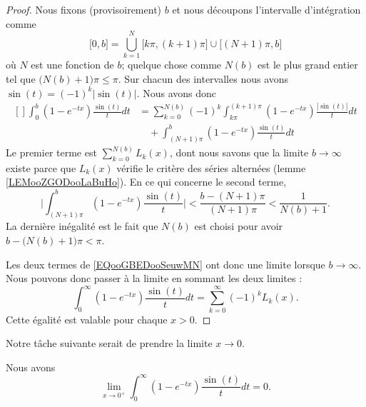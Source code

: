 \begin{proof}
    Nous fixons (provisoirement) \( b\) et nous découpons l'intervalle d'intégration comme
    \begin{equation}
        \mathopen[ 0 , b \mathclose]=\bigcup_{k=1}^N\mathopen[ k\pi , (k+1)\pi \mathclose]\cup\mathopen\big[ (N+1)\pi  , b \mathclose\big]
    \end{equation}
    où \( N\) est une fonction de \( b\); quelque chose comme \( N(b)\) est le plus grand entier tel que \(\big( N(b)+1 \big)\pi\leq \pi\). Sur chacun des intervalles nous avons \( \sin(t)=(-1)^k| \sin(t) |\). Nous avons donc
    \begin{equation}       \label{EQooGBEDooSeuwMN}
        \begin{aligned}[]
            \int_0^b(1- e^{-tx})\frac{ \sin(t) }{ t }dt&=\sum_{k=0}^{N(b)}(-1)^k\int_{k\pi}^{(k+1)\pi}(1- e^{-tx})\frac{ | \sin(t) | }{ t }dt\\
                &\quad+\int_{(N+1)\pi}^b(1- e^{-tx})\frac{ \sin(t) }{ t }dt
        \end{aligned}
    \end{equation}
    Le premier terme est \( \sum_{k=0}^{N(b)}L_k(x)\), dont nous savons que la limite \( b\to \infty\) existe parce que \( L_k(x)\) vérifie le critère des séries alternées (lemme \ref{LEMooZGODooLaBuHo}). En ce qui concerne le second terme,
    \begin{equation}
        \big|\int_{(N+1)\pi}^b (1- e^{-tx})\frac{ \sin(t) }{ t }\big| <  \frac{  b-( N+1 )\pi    }{ ( N+1 )\pi }<\frac{1}{ N(b)+1 }.
    \end{equation}
    La dernière inégalité est le fait que \( N(b)\) est choisi pour avoir \( b-\big( N(b)+1 \big)\pi<\pi\).

            Les deux termes de \eqref{EQooGBEDooSeuwMN} ont donc une limite lorsque \( b\to \infty\). Nous pouvons donc passer à la limite en sommant les deux limites :
            \begin{equation}
                \int_0^{\infty}(1- e^{-tx})\frac{ \sin(t) }{ t }dt=\sum_{k=0}^{\infty}(-1)^kL_k(x).
            \end{equation}
            Cette égalité est valable pour chaque \( x>0\). 
            
\end{proof}

Notre tâche suivante serait de prendre la limite \( x\to 0\).
\begin{lemma}
    Nous avons
    \begin{equation}
        \lim_{x\to 0^+} \int_0^{\infty}(1- e^{-tx})\frac{ \sin(t) }{ t }dt=0.
    \end{equation}
\end{lemma}

